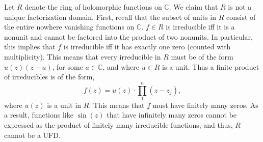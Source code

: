 \documentclass{article}
\begin{document}
	Let $R$ denote the ring of holomorphic functions on $\mathbb{C}$. We claim that $R$ is not a unique factorization domain. First, recall that the subset of units in $R$ consist of the entire nowhere vanishing functions on $\mathbb{C}$. $f \in R$ is irreducible iff it is a nonunit and cannot be factored into the product of two nonunits. In particular, this implies that $f$ is irreducible iff it has exactly one zero (counted with multiplicity). This means that every irreducible in $R$ must be of the form $u(z)(z - a)$, for some $a \in \mathbb{C}$, and where $u \in R$ is a unit. Thus a finite product of irreducibles is of the form, 
	\begin{equation*}
		f(z) = u(z) \cdot \prod_{1}^{n}(z - z_{j}), 
	\end{equation*}
	where $u(z)$ is a unit in $R$. This means that $f$ must have finitely many zeros. As a result, functions like $\sin(z)$ that have infinitely many zeros cannot be expressed as the product of finitely many irreducible functions, and thus, $R$ cannot be a UFD. 
	
\end{document}
